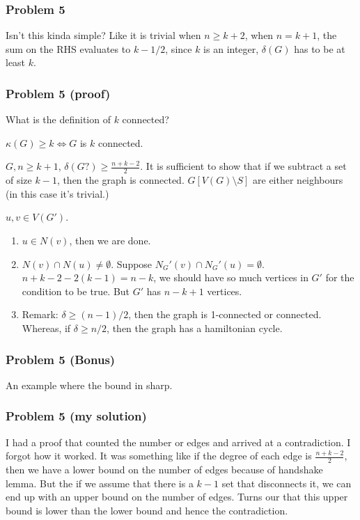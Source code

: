 \documentclass[11pt]{article}
\begin{document}
\subsubsection{Problem 5}
\label{sec:org1604b5a}
Isn't this kinda simple? Like it is trivial when \(n \ge k+2\), when \(n= k+1\),
the sum on the RHS evaluates to \(k -1/2\), since \(k\) is an integer,
\(\delta(G)\) has to be at least \(k\).
\subsubsection{Problem 5 (proof)}
\label{sec:org8663852}
What is the definition of \(k\) connected?

\(\kappa(G) \ge k \iff G\) is \(k\) connected.

\(G, n \ge k+1\), \(\delta(G?) \ge \frac{n+k-2}{2}\). It is sufficient to show
that if we subtract a set of size \(k-1\), then the graph is connected.
\(G[V(G)\setminus S]\) are either neighbours (in this case it's trivial.)

\(u, v \in V(G')\).

\begin{enumerate}
\item \(u \in N(v)\), then we are done.
\item \(N(v) \cap N(u) \neq \emptyset\). Suppose \(N_G'(v) \cap N_G'(u) = \emptyset\).
\(n+k-2 - 2(k-1) = n-k\), we should have so much vertices in \(G'\) for the
condition to be true. But \(G'\) has \(n-k+1\) vertices.
\item Remark: \(\delta \ge (n-1)/2\), then the graph is 1-connected or connected.
Whereas, if \(\delta \ge n/2\), then the graph has a hamiltonian cycle.
\end{enumerate}
\subsubsection{Problem 5 (Bonus)}
\label{sec:org2761b59}
An example where the bound in sharp.
\subsubsection{Problem 5 (my solution)}
\label{sec:orga72eefd}
I had a proof that counted the number or edges and arrived at a
contradiction. I forgot how it worked. It was something like if the degree
of each edge is \(\frac{n+k-2}{2}\), then we have a lower bound on the number
of edges because of handshake lemma. But the if we assume that there is a
\(k-1\) set that disconnects it, we can end up with an upper bound on the
number of edges. Turns our that this upper bound is lower than the lower
bound and hence the contradiction.
\end{document}
